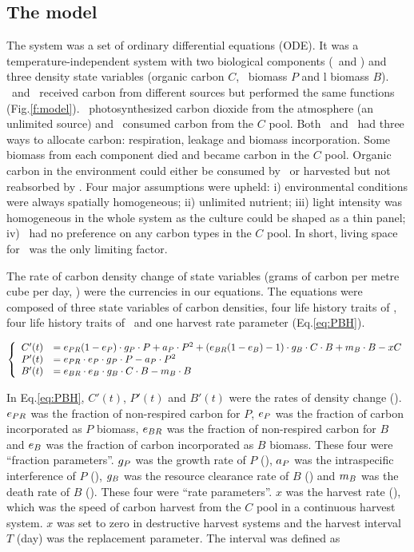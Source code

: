 \documentclass[../thesis.tex]{subfiles} %
\begin{document}
\subsection{The model}
The system was a set of ordinary differential equations (ODE).  It was a temperature-independent system with two biological components (\phy\ and \bac) and three density state variables (organic carbon $C$, \phy\ biomass $P$ and \bac l biomass $B$). \Phy\ and \bac\ received carbon from different sources but performed the same functions (Fig.\ref{f:model}). \Phy\ photosynthesized carbon dioxide from the atmosphere (an unlimited source) and \bac\ consumed carbon from the $C$ pool.  Both \phy\ and \bac\ had three ways to allocate carbon: respiration, leakage and biomass incorporation. Some biomass from each component died and became carbon in the $C$ pool.  Organic carbon in the environment could either be consumed by \bac\ or harvested but not reabsorbed by \phy.  Four major assumptions were upheld:  \Rn{1}) environmental conditions were always spatially homogeneous; \Rn{2}) unlimited nutrient; \Rn{3}) light intensity was homogeneous in the whole system as the culture could be shaped as a thin panel; \Rn{4}) \bac\ had no preference on any carbon types in the $C$ pool.  In short, living space for \phy\ was the only limiting factor.

The rate of carbon density change of state variables (grams of carbon per metre cube per day, \dxdt) were the currencies in our equations.  The equations were composed of three state variables of carbon densities, four life history traits of \phy, four life history traits of \bac\ and one harvest rate parameter (Eq.\ref{eq:PBH}).

\begin{equation}\left\{\begin{array}{rl}
    C'(t) &= e_{PR}(1-e_P)\cdot g_P\cdot P +a_P\cdot P^2 +(e_{BR}(1-e_B)-1)\cdot g_B\cdot C\cdot B +m_B\cdot B -xC\\
    P'(t) &= e_{PR}\cdot e_P\cdot g_P\cdot P -a_P\cdot P^2\\
    B'(t) &= e_{BR}\cdot e_B\cdot g_B\cdot C\cdot B -m_B\cdot B
\end{array}\right.\label{eq:PBH}\end{equation}

In Eq.\ref{eq:PBH}, $C'(t)$, $P'(t)$ and $B'(t)$ were the rates of density change (\dxdt).  $e_{PR}$ was the fraction of non-respired carbon for $P$, $e_P$ was the fraction of carbon incorporated as $P$ biomass, $e_{BR}$ was the fraction of non-respired carbon for $B$ and $e_B$ was the fraction of carbon incorporated as $B$ biomass.  These four were ``fraction parameters”.  $g_P$ was the growth rate of $P$ (\dayU), $a_P$ was the intraspecific interference of $P$ (\denI), $g_B$ was the resource clearance rate of $B$  (\denI) and $m_B$ was the death rate of $B$ (\dayU).  These four were ``rate parameters”.  $x$ was the harvest rate (\dayU), which was the speed of carbon harvest from the $C$ pool in a continuous harvest system.  $x$ was set to zero in destructive harvest systems and the harvest interval $T$ (day) was the replacement parameter.  The interval was defined as
\end{document}
